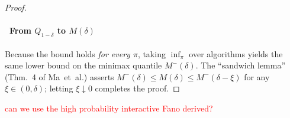 \documentclass[conference]{IEEEtran}
\begin{document}
\begin{proof}
\paragraph{\textbf{~From $Q_{1-\delta}$ to $M(\delta)$}}
Because the bound holds
\emph{for every $\pi$}, taking $\inf_{\pi}$ over algorithms yields the same lower bound on the minimax quantile $M^{-}(\delta)$.
The ``sandwich lemma'' (Thm.~4 of Ma~et~al.) asserts
\(
  M^{-}(\delta)
  \le
  M(\delta)
  \le
  M^{-}(\delta-\xi)
\)
for any $\xi\in(0,\delta)$; letting $\xi\downarrow0$ completes the proof.
\end{proof}
\textcolor{red}{can we use the high probability interactive Fano derived?}
\fi

%
\end{document}
